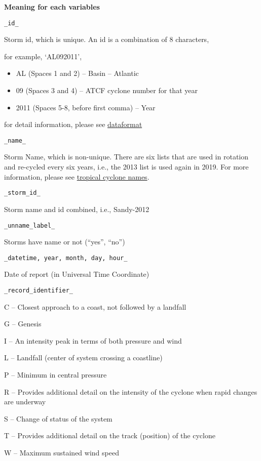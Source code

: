 \documentclass[]{book}
\begin{document}
\textbf{Meaning for each variables}

\texttt{\_id\_}

Storm id, which is unique. An id is a combination of 8 characters,

for example, `AL092011',

\begin{itemize}
\item
  AL (Spaces 1 and 2) -- Basin -- Atlantic
\item
  09 (Spaces 3 and 4) -- ATCF cyclone number for that year
\item
  2011 (Spaces 5-8, before first comma) -- Year
\end{itemize}

for detail information, please see \href{https://www.nhc.noaa.gov/data/hurdat/hurdat2-format-atlantic.pdf}{dataformat}

\texttt{\_name\_}

Storm Name, which is non-unique. There are six lists that are used in rotation and re-cycled every six years, i.e., the 2013 list is used again in 2019. For more information, please see \href{https://www.nhc.noaa.gov/aboutnames.shtml}{tropical cyclone names}.

\texttt{\_storm\_id\_}

Storm name and id combined, i.e., Sandy-2012

\texttt{\_unname\_label\_}

Storms have name or not (``yes'', ``no'')

\texttt{\_datetime,\ year,\ month,\ day,\ hour\_}

Date of report (in Universal Time Coordinate)

\texttt{\_record\_identifier\_}

C -- Closest approach to a coast, not followed by a landfall

G -- Genesis

I -- An intensity peak in terms of both pressure and wind

L -- Landfall (center of system crossing a coastline)

P -- Minimum in central pressure

R -- Provides additional detail on the intensity of the cyclone when rapid changes are underway

S -- Change of status of the system

T -- Provides additional detail on the track (position) of the cyclone

W -- Maximum sustained wind speed
\end{document}

